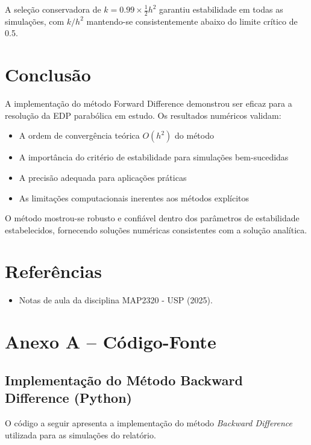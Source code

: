 \documentclass[10pt,twocolumn]{article}
\begin{document}
A seleção conservadora de $k = 0.99 \times \frac{1}{2}h^2$ garantiu estabilidade em todas as simulações, com $k/h^2$ mantendo-se consistentemente abaixo do limite crítico de 0.5.

\newpage
\section{Conclusão}

A implementação do método Forward Difference demonstrou ser eficaz para a resolução da EDP parabólica em estudo. Os resultados numéricos validam:

\begin{itemize}
    \item A ordem de convergência teórica $O(h^2)$ do método
    \item A importância do critério de estabilidade para simulações bem-sucedidas
    \item A precisão adequada para aplicações práticas
    \item As limitações computacionais inerentes aos métodos explícitos
\end{itemize}

O método mostrou-se robusto e confiável dentro dos parâmetros de estabilidade estabelecidos, fornecendo soluções numéricas consistentes com a solução analítica.

\section{Referências}
\begin{itemize}
  \item Notas de aula da disciplina MAP2320 - USP (2025).
\end{itemize}

\newpage
\appendix
\section*{Anexo A – Código-Fonte}

\subsection*{Implementação do Método Backward Difference (Python)}

O código a seguir apresenta a implementação do método \textit{Backward Difference} utilizada para as simulações do relatório.
\end{document}
